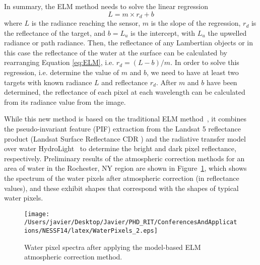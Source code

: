\documentclass{article}
\begin{document}
In summary, the ELM method needs to solve the linear regression
\begin{equation}
  \label{eq:ELM} 
  L = m\times r_d + b
\end{equation}
where $L$ is the radiance reaching the sensor, $m$ is the slope of the regression, $r_d$ is the reflectance of the target, and $b=L_u$ is the intercept, with $L_u$ the upwelled radiance or path radiance. Then, the reflectance of any Lambertian objects or in this case the reflectance of the water at the surface can be calculated by rearranging Equation \ref{eq:ELM}, i.e. $r_d=(L-b)/m$. In order to solve this regression, i.e. determine the value of $m$ and $b$, we need to have at least two targets with known radiance $L$ and reflectance $r_d$. After $m$ and $b$ have been determined, the reflectance of each pixel at each wavelength can be calculated from its radiance value from the image.

While this new method is based on the traditional ELM method~\cite{Smith:1999}, it combines the pseudo-invariant feature (PIF) extraction from the Landsat 5 reflectance product (Landsat Surface Reflectance CDR \cite{LandsatCDR}) and the radiative transfer model over water HydroLight~\cite{MobleyHE} to determine the bright and dark pixel reflectance, respectively. Preliminary results of the atmospheric correction methods for an area of water in the Rochester, NY region are shown in Figure~\ref{fig:waterpxs}, which shows the spectrum of the water pixels after atmospheric correction (in reflectance values), and these exhibit shapes that correspond with the shapes of typical water pixels. 

\begin{figure}
    \centering
      \texttt{[image: /Users/javier/Desktop/Javier/PHD\_RIT/ConferencesAndApplications/NESSF14/latex/WaterPixels\_2.eps]}
      \caption{Water pixel spectra after applying the model-based ELM atmospheric correction method.}
      \label{fig:waterpxs}
\end{figure}
 
\end{document}
